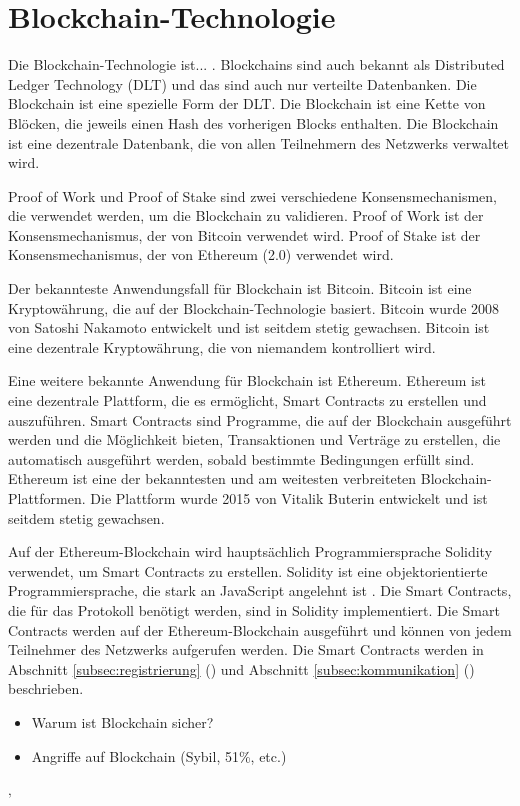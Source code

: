 \section{Blockchain-Technologie}
Die Blockchain-Technologie ist... . Blockchains sind auch bekannt als Distributed Ledger 
Technology (DLT) und das sind auch nur verteilte Datenbanken. Die Blockchain ist eine
spezielle Form der DLT. Die Blockchain ist eine Kette von Blöcken, die jeweils einen
Hash des vorherigen Blocks enthalten. Die Blockchain ist eine dezentrale Datenbank, die
von allen Teilnehmern des Netzwerks verwaltet wird.

Proof of Work und Proof of Stake sind zwei verschiedene Konsensmechanismen, die verwendet
werden, um die Blockchain zu validieren. Proof of Work ist der Konsensmechanismus, der
von Bitcoin verwendet wird. Proof of Stake ist der Konsensmechanismus, der von Ethereum (2.0)
verwendet wird.

Der bekannteste Anwendungsfall für Blockchain ist Bitcoin. Bitcoin ist eine Kryptowährung,
die auf der Blockchain-Technologie basiert. Bitcoin wurde 2008 von Satoshi Nakamoto entwickelt
und ist seitdem stetig gewachsen. Bitcoin ist eine dezentrale Kryptowährung, die von niemandem
kontrolliert wird.

Eine weitere bekannte Anwendung für Blockchain ist Ethereum. Ethereum ist eine dezentrale
Plattform, die es ermöglicht, Smart Contracts zu erstellen und auszuführen. Smart Contracts
sind Programme, die auf der Blockchain ausgeführt werden und die Möglichkeit bieten, Transaktionen und
Verträge zu erstellen, die automatisch ausgeführt werden, sobald bestimmte Bedingungen erfüllt sind.
Ethereum ist eine der bekanntesten und am weitesten verbreiteten Blockchain-Plattformen. Die Plattform
wurde 2015 von Vitalik Buterin entwickelt und ist seitdem stetig gewachsen.


Auf der Ethereum-Blockchain wird hauptsächlich Programmiersprache Solidity verwendet, um Smart Contracts zu erstellen. Solidity ist eine objektorientierte Programmiersprache, die stark an JavaScript angelehnt ist \parencite[S. 131]{Antonopoulos_MasteringEthereum}. Die Smart Contracts, die für das Protokoll benötigt werden, sind in Solidity implementiert. Die Smart Contracts werden auf der Ethereum-Blockchain ausgeführt und können von jedem Teilnehmer des Netzwerks aufgerufen werden. Die Smart Contracts werden in Abschnitt \ref{subsec:registrierung} () und Abschnitt \ref{subsec:kommunikation} () beschrieben.

\begin{itemize}
    \item Warum ist Blockchain sicher?
    \item Angriffe auf Blockchain (Sybil, 51\%, etc.)
\end{itemize}


‚